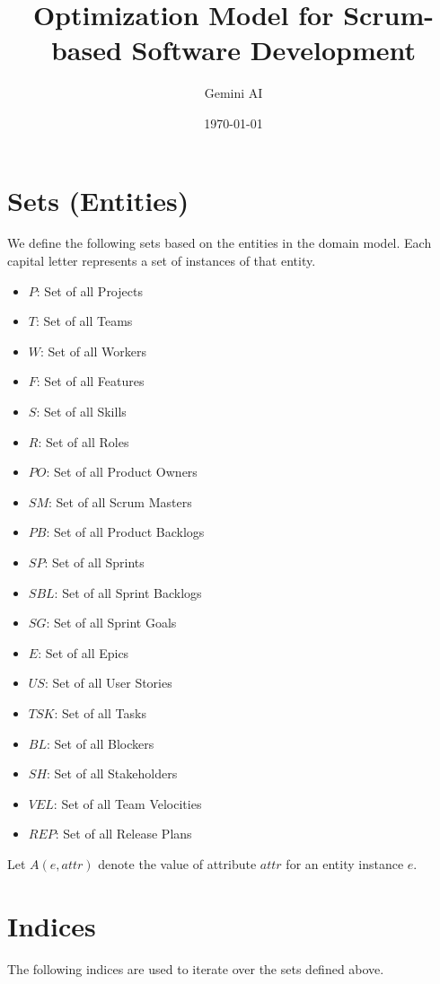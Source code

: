 \documentclass{article}
\title{Optimization Model for Scrum-based Software Development}
\author{Gemini AI}
\date{\today}
\begin{document}
\maketitle
\tableofcontents
\newpage

\section{Sets (Entities)}
We define the following sets based on the entities in the domain model. Each capital letter represents a set of instances of that entity.

\begin{itemize}
    \item $P$: Set of all Projects
    \item $T$: Set of all Teams
    \item $W$: Set of all Workers
    \item $F$: Set of all Features
    \item $S$: Set of all Skills
    \item $R$: Set of all Roles
    \item $PO$: Set of all Product Owners
    \item $SM$: Set of all Scrum Masters
    \item $PB$: Set of all Product Backlogs
    \item $SP$: Set of all Sprints
    \item $SBL$: Set of all Sprint Backlogs
    \item $SG$: Set of all Sprint Goals
    \item $E$: Set of all Epics
    \item $US$: Set of all User Stories
    \item $TSK$: Set of all Tasks
    \item $BL$: Set of all Blockers
    \item $SH$: Set of all Stakeholders
    \item $VEL$: Set of all Team Velocities
    \item $REP$: Set of all Release Plans
\end{itemize}

Let $A(e, attr)$ denote the value of attribute $attr$ for an entity instance $e$.

\section{Indices}
The following indices are used to iterate over the sets defined above.
\end{document}
